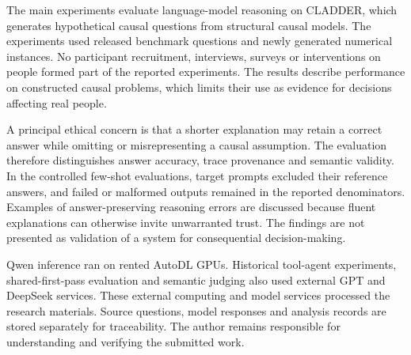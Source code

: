 The main experiments evaluate language-model reasoning on CLADDER, which generates hypothetical causal questions from structural causal models. The experiments used released benchmark questions and newly generated numerical instances. No participant recruitment, interviews, surveys or interventions on people formed part of the reported experiments. The results describe performance on constructed causal problems, which limits their use as evidence for decisions affecting real people.

A principal ethical concern is that a shorter explanation may retain a correct answer while omitting or misrepresenting a causal assumption. The evaluation therefore distinguishes answer accuracy, trace provenance and semantic validity. In the controlled few-shot evaluations, target prompts excluded their reference answers, and failed or malformed outputs remained in the reported denominators. Examples of answer-preserving reasoning errors are discussed because fluent explanations can otherwise invite unwarranted trust. The findings are not presented as validation of a system for consequential decision-making.

Qwen inference ran on rented AutoDL GPUs. Historical tool-agent experiments, shared-first-pass evaluation and semantic judging also used external GPT and DeepSeek services. These external computing and model services processed the research materials. Source questions, model responses and analysis records are stored separately for traceability. The author remains responsible for understanding and verifying the submitted work.
